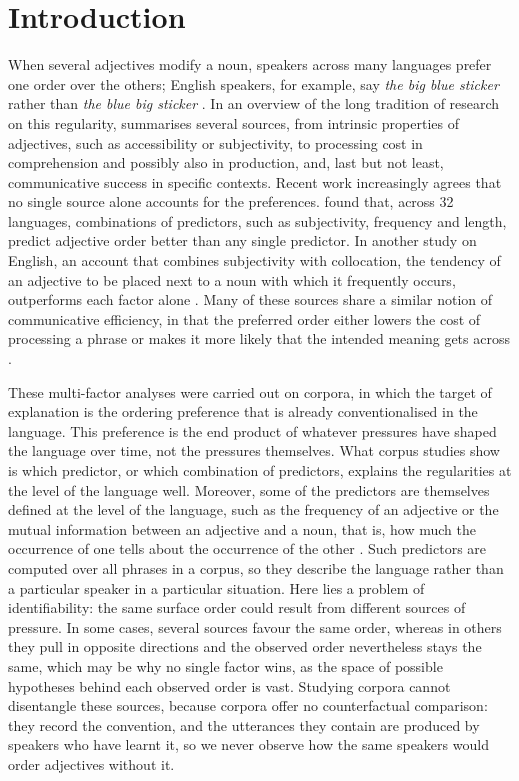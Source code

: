 \documentclass[10pt,a4paper,fleqn]{article}
\begin{document}
\section{Introduction}

When several adjectives modify a noun, speakers across many languages prefer one order over the others; English speakers, for example, say \emph{the big blue sticker} rather than \emph{the blue big sticker} \citep{dixon1982,sproat1991,cinque1994,scott2002}.
In an overview of the long tradition of research on this regularity, \citet{scontras2023adjective} summarises several sources, from intrinsic properties of adjectives, such as accessibility or subjectivity, to processing cost in comprehension and possibly also in production, and, last but not least, communicative success in specific contexts.
Recent work increasingly agrees that no single source alone accounts for the preferences.
\citet{dyer2023evaluating} found that, across 32 languages, combinations of predictors, such as subjectivity, frequency and length, predict adjective order better than any single predictor.
In another study on English, an account that combines subjectivity with collocation, the tendency of an adjective to be placed next to a noun with which it frequently occurs, outperforms each factor alone \parencites{futrell-etal-2020-determines}[see also][]{scontras2023adjective}.
Many of these sources share a similar notion of communicative efficiency, in that the preferred order either lowers the cost of processing a phrase or makes it more likely that the intended meaning gets across \citep{scontras2023adjective}.

These multi-factor analyses were carried out on corpora, in which the target of explanation is the ordering preference that is already conventionalised in the language.
This preference is the end product of whatever pressures have shaped the language over time, not the pressures themselves.
What corpus studies show is which predictor, or which combination of predictors, explains the regularities at the level of the language well.
Moreover, some of the predictors are themselves defined at the level of the language, such as the frequency of an adjective \citep{dyer2023evaluating} or the mutual information between an adjective and a noun, that is, how much the occurrence of one tells about the occurrence of the other \citep{Hahn_information_2018}.
Such predictors are computed over all phrases in a corpus, so they describe the language rather than a particular speaker in a particular situation.
Here lies a problem of identifiability: the same surface order could result from different sources of pressure.
In some cases, several sources favour the same order, whereas in others they pull in opposite directions and the observed order nevertheless stays the same, which may be why no single factor wins, as the space of possible hypotheses behind each observed order is vast.
Studying corpora cannot disentangle these sources, because corpora offer no counterfactual comparison: they record the convention, and the utterances they contain are produced by speakers who have learnt it, so we never observe how the same speakers would order adjectives without it.
\end{document}
